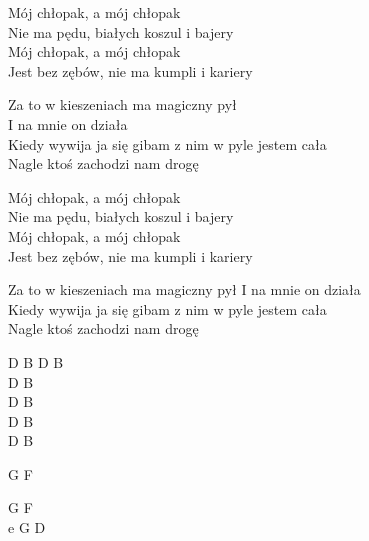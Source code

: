 \begin{text}
    \ifchorded{\hfill\break}
    Mój chłopak, a mój chłopak\\
    Nie ma pędu, białych koszul i bajery\\
    Mój chłopak, a mój chłopak\\
    Jest bez zębów, nie ma kumpli i kariery

    Za to w kieszeniach ma magiczny pył\\
    I na mnie on działa\\
    Kiedy wywija ja się gibam z nim w pyle jestem cała\\
    Nagle ktoś zachodzi nam drogę

    Mój chłopak, a mój chłopak\\
    Nie ma pędu, białych koszul i bajery\\
    Mój chłopak, a mój chłopak\\
    Jest bez zębów, nie ma kumpli i kariery

    Za to w kieszeniach ma magiczny pył I na mnie on działa\\
    Kiedy wywija ja się gibam z nim w pyle jestem cała\\
    Nagle ktoś zachodzi nam drogę
\end{text}
\begin{chord}
    D B D B\\
    D B\\
    D B\\
    D B\\
    D B

    G F

    G F\\
    e G D
\end{chord}